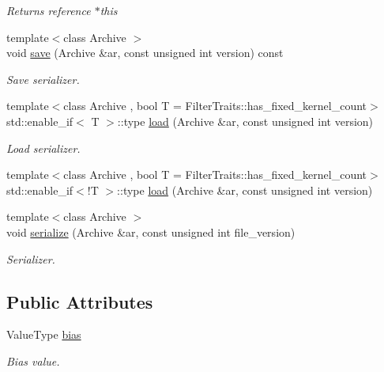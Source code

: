\begin{DoxyCompactItemize}
\begin{DoxyCompactList}\small\item\em Returns reference {\ttfamily $\ast$this} \end{DoxyCompactList}\item 
{\footnotesize template$<$class Archive $>$ }\\void \hyperlink{structffnn_1_1layer_1_1convolution_1_1_filter_a3576f3b3dcee20667295675b7daa7068}{save} (Archive \&ar, const unsigned int version) const 
\begin{DoxyCompactList}\small\item\em Save serializer. \end{DoxyCompactList}\item 
{\footnotesize template$<$class Archive , bool T = Filter\-Traits\-::has\-\_\-fixed\-\_\-kernel\-\_\-count$>$ }\\std\-::enable\-\_\-if$<$ T $>$\-::type \hyperlink{structffnn_1_1layer_1_1convolution_1_1_filter_ad521dc58c7b147be2d893da898472282}{load} (Archive \&ar, const unsigned int version)
\begin{DoxyCompactList}\small\item\em Load serializer. \end{DoxyCompactList}\item 
{\footnotesize template$<$class Archive , bool T = Filter\-Traits\-::has\-\_\-fixed\-\_\-kernel\-\_\-count$>$ }\\std\-::enable\-\_\-if$<$!T $>$\-::type \hyperlink{structffnn_1_1layer_1_1convolution_1_1_filter_a4da00a1c6cdb3eba549096167f77e2aa}{load} (Archive \&ar, const unsigned int version)
\item 
{\footnotesize template$<$class Archive $>$ }\\void \hyperlink{structffnn_1_1layer_1_1convolution_1_1_filter_ad538563ee30fbb666b884469baebeee7}{serialize} (Archive \&ar, const unsigned int file\-\_\-version)
\begin{DoxyCompactList}\small\item\em Serializer. \end{DoxyCompactList}\end{DoxyCompactItemize}
\subsection*{Public Attributes}
\begin{DoxyCompactItemize}
\item 
Value\-Type \hyperlink{structffnn_1_1layer_1_1convolution_1_1_filter_afa0084834dadf4ffdd2310593560423b}{bias}
\begin{DoxyCompactList}\small\item\em Bias value. \end{DoxyCompactList}\end{DoxyCompactItemize}


